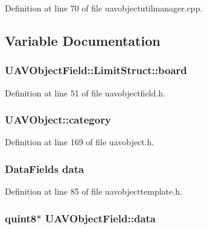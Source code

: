 Definition at line 70 of file uavobjectutilmanager.\-cpp.



\subsection{Variable Documentation}
\hypertarget{group___u_a_v_objects_plugin_gae5d5e0653c652c0e50c62526f8fbee72}{
\subsubsection[{board}]{ U\-A\-V\-Object\-Field\-::\-Limit\-Struct\-::board}}\label{group___u_a_v_objects_plugin_gae5d5e0653c652c0e50c62526f8fbee72}


Definition at line 51 of file uavobjectfield.\-h.

\hypertarget{group___u_a_v_objects_plugin_gae96da3f59e51fb5c3ca43056bda4a63e}{
\subsubsection[{category}]{ U\-A\-V\-Object\-::category\hspace{0.3cm}{\ttfamily [protected]}}}\label{group___u_a_v_objects_plugin_gae96da3f59e51fb5c3ca43056bda4a63e}


Definition at line 169 of file uavobject.\-h.

\hypertarget{group___u_a_v_objects_plugin_gae812e608461959ae131d5aca91d97434}{
\subsubsection[{data}]{\setlength{\rightskip}{0pt plus 5cm}Data\-Fields {\bf data}}}\label{group___u_a_v_objects_plugin_gae812e608461959ae131d5aca91d97434}


Definition at line 85 of file uavobjecttemplate.\-h.

\hypertarget{group___u_a_v_objects_plugin_gae6a068d71cfd70f70c7e6fb10f217ca5}{
\subsubsection[{data}]{\setlength{\rightskip}{0pt plus 5cm}quint8$\ast$ U\-A\-V\-Object\-Field\-::data\hspace{0.3cm}{\ttfamily [protected]}}}\label{group___u_a_v_objects_plugin_gae6a068d71cfd70f70c7e6fb10f217ca5}


